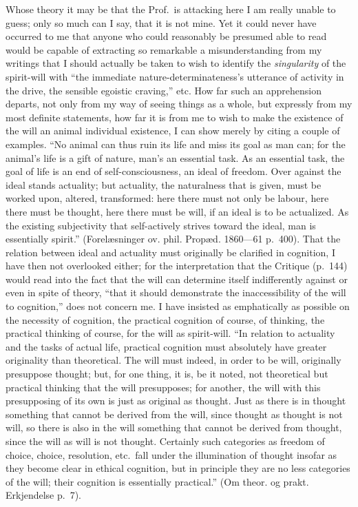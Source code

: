 \documentclass[12pt]{book}
\newcommand{\opage}[1]{\marginnote{\footnotesize\textit{[#1]}}}
\begin{document}
Whose theory it may be that the Prof.\ is attacking here I am really
unable to guess; only so much can I say, that it is not mine. Yet it could
never have occurred to me that anyone who could reasonably be presumed
able to read would be capable of extracting so remarkable a
misunderstanding from my writings that I should actually be taken to wish
to identify the \emph{singularity} of the spirit-will with ``the immediate
nature-determinateness's utterance of activity in the drive, the sensible
egoistic craving,'' etc. How far such an apprehension departs, not only
from my way of seeing things as a whole, but expressly from my most
definite statements, how far it is from me to wish to make the existence
of the will an animal individual existence, I can show merely by citing a
couple of examples. ``No animal can thus ruin its life and miss its goal as
man can; for the animal's life is a gift of nature, man's an essential
task. As an essential task, the goal of life is an end of
self-consciousness, an ideal of freedom. Over against the ideal stands
actuality; but actuality, the naturalness that is given, must be worked
upon, altered, transformed: here there must not only be labour, here there
must be thought, here there must be will, if an ideal is to be actualized.
As the existing subjectivity that self-actively strives toward the ideal,
man is essentially spirit.'' (Forelæsninger ov. phil. Propæd. 1860---61
p.\ 400). That the relation between ideal and actuality must originally be
clarified in cognition, I have then not overlooked either; for the
interpretation that the Critique (p.\ 144) would read into the fact that
the will can determine itself indifferently
\opage{33}\setcounter{footnote}{0}%
against or even in spite of theory, ``that it should demonstrate the
inaccessibility of the will to cognition,'' does not concern me. I have
insisted as emphatically as possible on the necessity of cognition, the
practical cognition of course, of thinking, the practical thinking of
course, for the will as spirit-will. ``In
relation to actuality and the tasks of actual life, practical cognition
must absolutely have greater originality than theoretical. The will must
indeed, in order to be will, originally presuppose thought; but, for one
thing, it is, be it noted, not theoretical but practical thinking that the
will presupposes; for another, the will with this presupposing of its own
is just as original as thought. Just as there is in thought something
that cannot be derived from the will, since thought as thought is not
will, so there is also in the will something that cannot be derived from
thought, since the will as will is not thought. Certainly such categories
as freedom of choice, choice, resolution, etc.\ fall under the
illumination of thought insofar as they become clear in ethical cognition,
but in principle they are no less categories of the will; their cognition
is essentially practical.'' (Om theor. og prakt. Erkjendelse p.\ 7).
\end{document}
